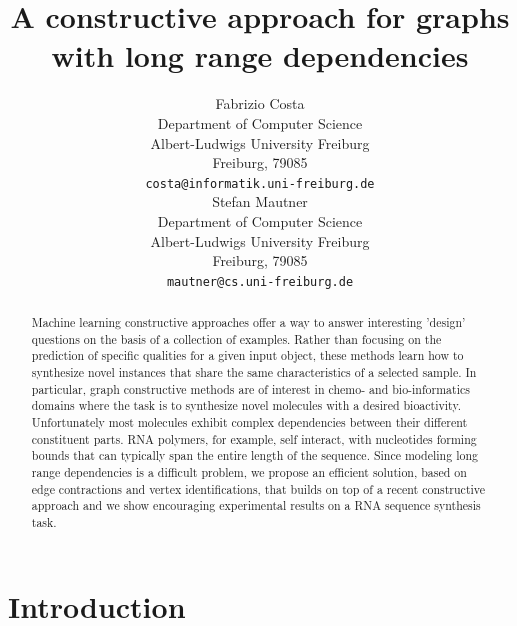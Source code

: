 \documentclass{article}
\title{A constructive approach for graphs\\with long range dependencies}
\author{
  Fabrizio Costa \\
  Department of Computer Science\\
  Albert-Ludwigs University Freiburg\\
  Freiburg, 79085  \\
  \texttt{costa@informatik.uni-freiburg.de} \\
  \And
  Stefan Mautner\\
  Department of Computer Science\\
  Albert-Ludwigs University Freiburg\\
  Freiburg, 79085  \\
  \texttt{mautner@cs.uni-freiburg.de} \\
}
\begin{document}

\maketitle

\begin{abstract}

Machine learning constructive approaches offer a way to answer interesting
'design' questions on the basis of a collection of examples. Rather than
focusing on the prediction of specific qualities for a given input object,
these methods learn how to synthesize novel instances that share the same
characteristics of a selected sample. In particular, graph constructive
methods are of interest in chemo- and bio-informatics domains where the task
is to synthesize novel molecules with a desired bioactivity. Unfortunately
most molecules exhibit complex dependencies between their different
constituent parts. RNA polymers, for example, self interact, with nucleotides
forming bounds that can typically span the entire length of the sequence.
Since modeling long range dependencies is a difficult problem, we propose an
efficient solution, based on edge contractions and vertex identifications,
that builds on top of a recent constructive approach and we show encouraging
experimental results on a RNA sequence synthesis task.





\end{abstract}
\section{Introduction}
\end{document}

